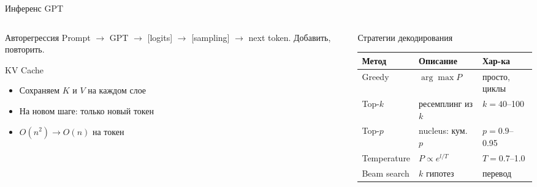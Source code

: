 \documentclass[aspectratio=169, 8pt]{beamer}
\begin{document}
\begin{frame}{Инференс GPT}
  \begin{columns}[T]
    \begin{column}{0.48\textwidth}
      \begin{block}{Авторегрессия}
        Prompt $\to$ GPT $\to$ [logits] $\to$ [sampling] $\to$ next token. Добавить, повторить.
      \end{block}
      \begin{block}{KV Cache}
        \begin{itemize}
          \item Сохраняем $K$ и $V$ на каждом слое
          \item На новом шаге: только новый токен
          \item $O(n^2) \to O(n)$ на токен
        \end{itemize}
      \end{block}
    \end{column}
    \begin{column}{0.52\textwidth}
      \begin{block}{Стратегии декодирования}
        \begin{tabular}{lll}
          \toprule
          \textbf{Метод} & \textbf{Описание} & \textbf{Хар-ка} \\
          \midrule
          Greedy & $\arg\max P$ & просто, циклы \\
          Top-$k$ & ресемплинг из $k$ & $k=40$--100 \\
          Top-$p$ & nucleus: кум. $p$ & $p=0.9$--0.95 \\
          Temperature & $P\propto e^{l/T}$ & $T=0.7$--1.0 \\
          Beam search & $k$ гипотез & перевод \\
          \bottomrule
        \end{tabular}
      \end{block}
    \end{column}
  \end{columns}
\end{frame}
\end{document}
